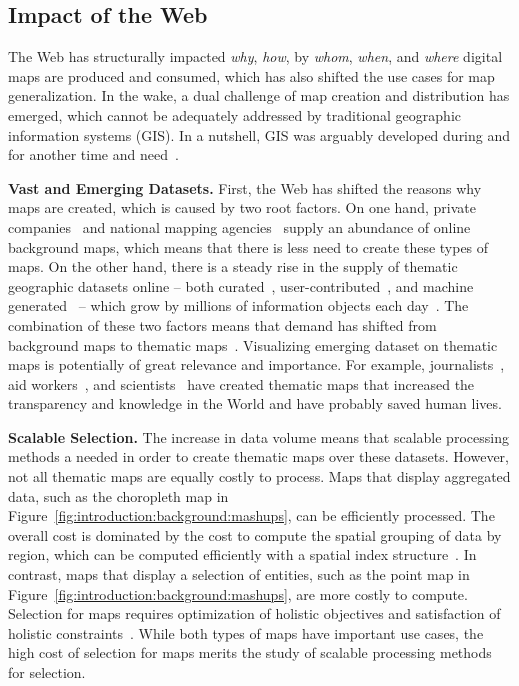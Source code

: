 \documentclass[11pt, oneside]{report}
\newcommand{\minisec}[1]{\noindent\textbf{#1.}}
\begin{document}
{\subsection{Impact of the Web}
The Web has structurally impacted \emph{why}, \emph{how}, by \emph{whom}, \emph{when}, and \emph{where} digital maps are produced and consumed, which has also shifted the use cases for map generalization. In the wake, a dual challenge of map creation and distribution has emerged, which cannot be adequately addressed by traditional geographic information systems (GIS). In a nutshell, GIS was arguably developed during and for another time and need~\cite{ucgis2014tomlinson}.

\minisec{Vast and Emerging Datasets}
First, the Web has shifted the reasons why maps are created, which is caused by two root factors. On one hand, private companies~\cite{google2014maps,stamen2014tiles,vizzuality2012cartodb} and national mapping agencies~\cite{gst2014digitalmapsupply} supply an abundance of online background maps, which means that there is less need to create these types of maps. On the other hand, there is a steady rise in the supply of thematic geographic datasets online -- both curated~\cite{mst2014miljo}, user-contributed~\cite{twitter2014twitter,zooniverse2014oldweather}, and machine generated~\cite{planetlabs2014flock1} -- which grow by millions of information objects each day~\cite{openstreetmap2014stats}. The combination of these two factors means that demand has shifted from background maps to thematic maps~\cite{bereuter2013real}. Visualizing emerging dataset on thematic maps is potentially of great relevance and importance. For example, journalists~\cite{lomet2012warstories}, aid workers~\cite{openstreetmap2010haiti}, and scientists~\cite{zooniverse2014oldweather} have created thematic maps that increased the transparency and knowledge in the World and have probably saved human lives. 

\minisec{Scalable Selection}
The increase in data volume means that scalable processing methods a needed in order to create thematic maps over these datasets. However, not all thematic maps are equally costly to process. Maps that display aggregated data, such as the choropleth map in Figure~\ref{fig:introduction:background:mashups}, can be efficiently processed. The overall cost is dominated by the cost to compute the spatial grouping of data by region, which can be computed efficiently with a spatial index structure~\cite{guttman1984rtree}. In contrast, maps that display a selection of entities, such as the point map in Figure~\ref{fig:introduction:background:mashups}, are more costly to compute. Selection for maps requires optimization of holistic objectives and satisfaction of holistic constraints~\cite{sarma2012fusiontables,nutanong2012multiresolution}. While both types of maps have important use cases, the high cost of selection for maps merits the study of scalable processing methods for selection.

}
\end{document}
